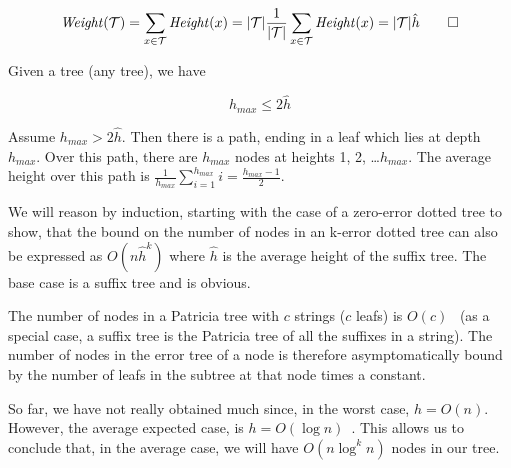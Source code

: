 \[ \mathit{Weight}(\mathcal{T}) = \sum_{x \in \mathcal{T}}\mathit{Height}(x) = |\mathcal{T}|\frac{1}{|\mathcal{T}|}\sum_{x \in \mathcal{T}}\mathit{Height}(x) = |\mathcal{T}|\hat{h} \qed \]

\begin{lemma}
Given a tree (any tree), we have

\[ h_{max} \leq 2\hat{h} \]
\end{lemma}

\Proof Assume $h_{max} > 2\hat{h}$. Then there is a path, ending in a leaf which lies at depth $h_{max}$. Over this path, there are $h_{max}$ nodes at heights 1, 2, \dots $h_{max}$. The average height over this path is $\frac{1}{h_{max}}\sum_{i=1}^{h_{max}}i=\frac{h_{max}-1}{2}$.

We will reason by induction, starting with the case of a zero-error dotted tree to show, that the bound on the number of nodes in an k-error dotted tree can also be expressed as $O(n\hat{h}^k)$ where $\hat{h}$ is the average height of the suffix tree. The base case is a suffix tree and is obvious.

The number of nodes in a Patricia tree with $c$ strings ($c$ leafs) is $O(c)$~\cite{patricia} (as a special case, a suffix tree is the Patricia tree of all the suffixes in a string). The number of nodes in the error tree of a node is therefore asymptomatically bound by the number of leafs in the subtree at that node times a constant.




So far, we have not really obtained much since, in the worst case, $h=O(n)$. However, the average expected case, is $h=O(\log n)$~\cite{devroye:note,szpankowski:unexpected}. This allows us to conclude that, in the average case, we will have $O(n\log^k n)$ nodes in our tree.

